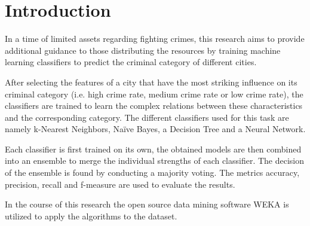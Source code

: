 \section{Introduction}

In a time of limited assets regarding fighting crimes,
this research aims to provide additional guidance to
those distributing the resources by training machine learning
classifiers to predict the criminal category of different cities.

After selecting the features of a city that have the most striking
influence on its criminal category (i.e. high crime rate, medium crime
rate or low crime rate), the classifiers are trained to learn the
complex relations between these characteristics and the corresponding
category. The different classifiers used for this task are
namely k-Nearest Neighbors, Na\"ive Bayes, a Decision Tree and a
Neural Network.

Each classifier is first trained on its own, the obtained models are
then combined into an ensemble to merge the individual
strengths of each classifier. The decision of the ensemble is found by
conducting a majority voting.
The metrics accuracy, precision, recall and f-measure are
used to evaluate the results.

In the course of this research the open source data mining software
WEKA is utilized to apply the algorithms to the dataset.

